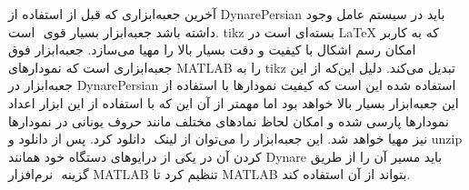 \documentclass[12pt]{article}
\begin{document}
آخرین جعبه‌ابزاری که قبل از استفاده از DynarePersian باید در سیستم عامل وجود داشته باشد جعبه‌ابزار بسیار قوی ‪‬‬‬ است. tikz بسته‌ای است در ‪\LaTeX‬‬ که به کاربر امکان رسم اشکال با کیفیت و دقت بسیار بالا را مهیا می‌سازد. جعبه‌ابزار فوق جعبه‌ابزاری است که نمودارهای MATLAB را به tikz تبدیل می‌کند. دلیل این‌که از این جعبه‌ابزار در DynarePersian استفاده شده این است که کیفیت نمودارها با استفاده از این جعبه‌ابزار بسیار بالا خواهد بود اما مهمتر از آن این ‌که با استفاده از این ابزار اعداد نمودارها پارسی شده و امکان لحاظ نمادهای مختلف مانند حروف یونانی در نمودارها نیز مهیا خواهد شد. این جعبه‌ابزار را می‌توان از لینک ‪‬‬‬‬ دانلود کرد. پس از دانلود و unzip کردن آن در یکی از درایوهای دستگاه خود همانند Dynare باید مسیر آن را از طریق گزینه ‪‬‬‬‬‬ نرم‌افزار MATLAB تنظیم کرد تا MATLAB بتواند از آن استفاده کند. ‪
\end{document}
